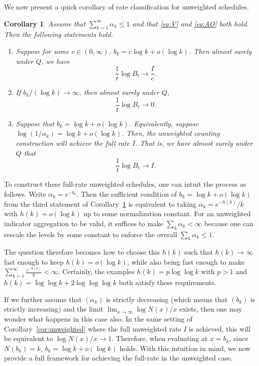 \documentclass{article}
\newtheorem{corollary}[theorem]{Corollary}
\theoremstyle{definition}
\begin{document}
We now present a quick corollary of rate classification for unweighted schedules.

\begin{corollary}\label{cor:classification}
Assume that $\sum_{k=1}^{\infty}\alpha_k\le 1$ and that \eqref{eq:V} and \eqref{eq:AO} both hold. Then the following statements hold.
\begin{enumerate}
    \item Suppose for some $c\in(0,\infty)$, $b_k=c\log k + o(\log k)$. Then almost surely under $Q$, we have
    \[
    \frac{1}{t}\log B_t\to \frac{I}{c}.
    \]
    \item If $b_k/(\log k)\longrightarrow \infty$, then almost surely under $Q$,
    \[
    \frac{1}{t}\log B_t\longrightarrow 0.
    \]
    \item Suppose that $b_k=\log k + o(\log k)$. Equivalently, suppose $\log(1/\alpha_k)=\log k + o(\log k)$. Then, the unweighted counting construction will achieve the full rate $I$. That is, we have almost surely under $Q$ that
    \[
    \frac{1}{t}\log B_t\longrightarrow I.
    \]
\end{enumerate}
\end{corollary}

To construct these full-rate unweighted schedules, one can intuit the process as follows. Write $\alpha_k=e^{-b_k}$. Then the sufficient condition of $b_k=\log k + o(\log k)$ from the third statement of Corollary~\ref{cor:classification} is equivalent to taking $\alpha_k = e^{-h(k)}/k$ with $h(k)=o(\log k)$ up to some normalization constant. For an unweighted indicator aggregation to be valid, it suffices to make $\sum_k \alpha_k<\infty$ because one can rescale the levels by some constant to enforce the overall $\sum_k \alpha_k\le 1$. 

The question therefore becomes how to choose this $h(k)$ such that $h(k)\to\infty$ fast enough to keep $h(k)=o(\log k)$, while also being fast enough to make $\sum_{k=1}^\infty \frac{e^{-h(k)}}{k}<\infty$. Certainly, the examples $h(k)=p\log\log k$ with $p>1$ and $h(k)=\log\log k + 2\log\log \log k$ both satisfy these requirements.

If we further assume that $(\alpha_k)$ is strictly decreasing (which means that $(b_k)$ is strictly increasing) and the limit $\lim_{x\to\infty}\log N(x)/x$ exists, then one may wonder what happens in this case also. In the same setting of Corollary~\ref{cor:unweighted} where the full unweighted rate $I$ is achieved, this will be equivalent to $\log N(x)/x\to 1$. Therefore, when evaluating at $x=b_k$, since $N(b_k)=k$, $b_k=\log k + o(\log k)$ holds. With this intuition in mind, we now provide a full framework for achieving the full-rate in the unweighted case. 
\end{document}
